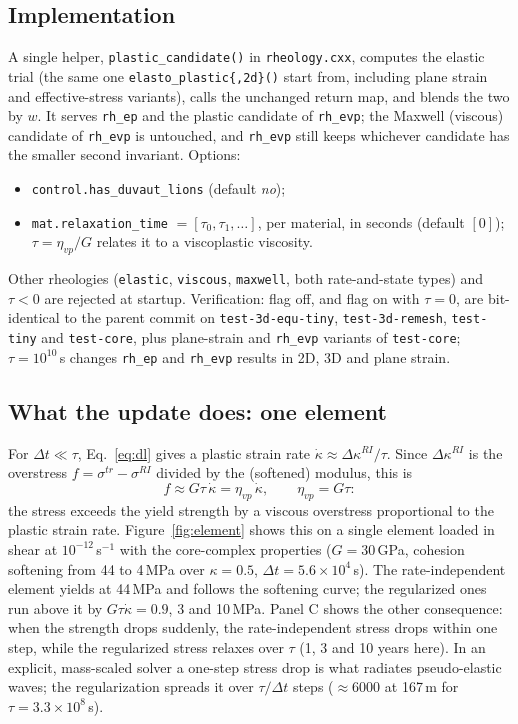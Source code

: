 \documentclass[11pt]{article}
\newcommand{\code}[1]{\texttt{#1}}
\begin{document}
\subsection{Implementation}
A single helper, \code{plastic\_candidate()} in \code{rheology.cxx}, computes the elastic trial
(the same one \code{elasto\_plastic\{,2d\}()} start from, including plane strain and
effective-stress variants), calls the unchanged return map, and blends the two by $w$. It serves
\code{rh\_ep} and the plastic candidate of \code{rh\_evp}; the Maxwell (viscous) candidate of
\code{rh\_evp} is untouched, and \code{rh\_evp} still keeps whichever candidate has the smaller
second invariant. Options:
\begin{itemize}
\item \code{control.has\_duvaut\_lions} (default \emph{no});
\item \code{mat.relaxation\_time} $=[\tau_0,\tau_1,\dots]$, per material, in seconds (default
  $[0]$); $\tau=\eta_{vp}/G$ relates it to a viscoplastic viscosity.
\end{itemize}
Other rheologies (\code{elastic}, \code{viscous}, \code{maxwell}, both rate-and-state types) and
$\tau<0$ are rejected at startup. Verification: flag off, and flag on with $\tau=0$, are
bit-identical to the parent commit on \code{test-3d-equ-tiny}, \code{test-3d-remesh},
\code{test-tiny} and \code{test-core}, plus plane-strain and \code{rh\_evp} variants of
\code{test-core}; $\tau=10^{10}$\,s changes \code{rh\_ep} and \code{rh\_evp} results in 2D, 3D and
plane strain.

\subsection{What the update does: one element}
For $\Delta t\ll\tau$, Eq.~\eqref{eq:dl} gives a plastic strain rate
$\dot\kappa\approx\Delta\kappa^{RI}/\tau$. Since $\Delta\kappa^{RI}$ is the overstress
$f=\sigma^{tr}-\sigma^{RI}$ divided by the (softened) modulus, this is
\begin{equation}
  f \approx G\tau\,\dot\kappa = \eta_{vp}\,\dot\kappa,\qquad \eta_{vp}=G\tau:
  \label{eq:over}
\end{equation}
the stress exceeds the yield strength by a viscous overstress proportional to the plastic strain
rate. Figure~\ref{fig:element} shows this on a single element loaded in shear at
$10^{-12}$\,s$^{-1}$ with the core-complex properties ($G=30$\,GPa, cohesion softening from 44 to
4\,MPa over $\kappa=0.5$, $\Delta t=5.6\times10^4$\,s). The rate-independent element yields at
44\,MPa and follows the softening curve; the regularized ones run above it by
$G\tau\dot\kappa=0.9$, 3 and 10\,MPa. Panel C shows the other consequence: when the strength drops
suddenly, the rate-independent stress drops within one step, while the regularized stress relaxes
over $\tau$ (1, 3 and 10 years here). In an explicit, mass-scaled solver a one-step stress drop is
what radiates pseudo-elastic waves; the regularization spreads it over $\tau/\Delta t$ steps
($\approx6000$ at 167\,m for $\tau=3.3\times10^8$\,s).
\end{document}
